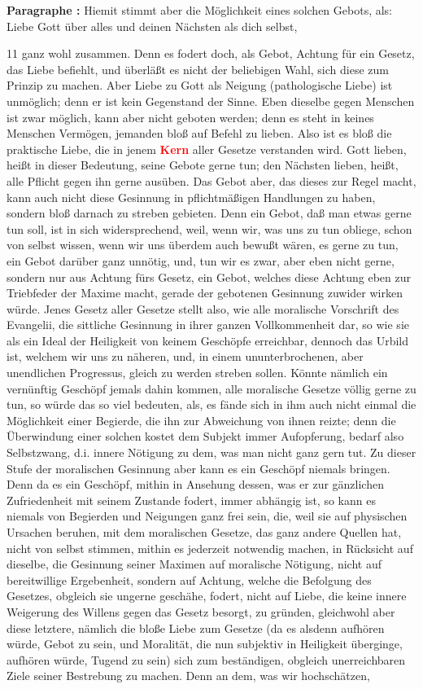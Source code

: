\documentclass[a4paper,12pt,twoside]{book}
\newcommand{\match}[1]{\textcolor{red}{\textbf{#1}}}
\begin{document}
	\noindent\textbf{Paragraphe : }Hiemit stimmt aber die Möglichkeit eines solchen Gebots, als: Liebe Gott über alles und deinen Nächsten als dich selbst,
	
	
	11
	ganz wohl zusammen. Denn es fodert doch, als Gebot, Achtung für ein Gesetz, das Liebe befiehlt, und überläßt es nicht der beliebigen Wahl, sich diese zum Prinzip zu machen. Aber Liebe zu Gott als Neigung (pathologische Liebe) ist unmöglich; denn er ist kein Gegenstand der Sinne. Eben dieselbe gegen Menschen ist zwar möglich, kann aber nicht geboten werden; denn es steht in keines Menschen Vermögen, jemanden bloß auf Befehl zu lieben. Also ist es bloß die praktische Liebe, die in jenem \match{Kern} aller Gesetze verstanden wird. Gott lieben, heißt in dieser Bedeutung, seine Gebote gerne tun; den Nächsten lieben, heißt, alle Pflicht gegen ihn gerne ausüben. Das Gebot aber, das dieses zur Regel macht, kann auch nicht diese Gesinnung in pflichtmäßigen Handlungen zu haben, sondern bloß darnach zu streben gebieten. Denn ein Gebot, daß man etwas gerne tun soll, ist in sich widersprechend, weil, wenn wir, was uns zu tun obliege, schon von selbst wissen, wenn wir uns überdem auch bewußt wären, es gerne zu tun, ein Gebot darüber ganz unnötig, und, tun wir es zwar, aber eben nicht gerne, sondern nur aus Achtung fürs Gesetz, ein Gebot, welches diese Achtung eben zur Triebfeder der Maxime macht, gerade der gebotenen Gesinnung zuwider wirken würde. Jenes Gesetz aller Gesetze stellt also, wie alle moralische Vorschrift des Evangelii, die sittliche  Gesinnung in ihrer ganzen Vollkommenheit dar, so wie sie als ein Ideal der Heiligkeit von keinem Geschöpfe erreichbar, dennoch das Urbild ist, welchem wir uns zu näheren, und, in einem ununterbrochenen, aber unendlichen Progressus, gleich zu werden streben sollen. Könnte nämlich ein vernünftig Geschöpf jemals dahin kommen, alle moralische Gesetze völlig gerne zu tun, so würde das so viel bedeuten, als, es fände sich in ihm auch nicht einmal die Möglichkeit einer Begierde, die ihn zur Abweichung von ihnen reizte; denn die Überwindung einer solchen kostet dem Subjekt immer Aufopferung, bedarf also Selbstzwang, d.i. innere Nötigung zu dem, was man nicht ganz gern tut. Zu dieser Stufe der moralischen Gesinnung aber kann es ein Geschöpf niemals bringen. Denn da es ein Geschöpf, mithin in Ansehung dessen, was er zur gänzlichen Zufriedenheit mit seinem Zustande fodert, immer abhängig ist, so kann es niemals von Begierden und Neigungen ganz frei sein, die, weil sie auf physischen Ursachen beruhen, mit dem moralischen Gesetze, das ganz andere Quellen hat, nicht von selbst stimmen, mithin es jederzeit notwendig machen, in Rücksicht auf dieselbe, die Gesinnung seiner Maximen auf moralische Nötigung, nicht auf bereitwillige Ergebenheit, sondern auf Achtung, welche die Befolgung des Gesetzes, obgleich sie ungerne geschähe, fodert, nicht auf Liebe, die keine innere Weigerung des Willens gegen das Gesetz besorgt, zu gründen, gleichwohl aber diese letztere, nämlich die bloße Liebe zum Gesetze (da es alsdenn aufhören würde, Gebot zu sein, und Moralität, die nun subjektiv in Heiligkeit überginge, aufhören würde, Tugend zu sein) sich zum beständigen, obgleich unerreichbaren Ziele seiner Bestrebung zu machen. Denn an dem, was wir hochschätzen, 
\end{document}
